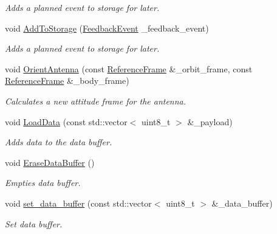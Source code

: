 \begin{DoxyCompactItemize}
\begin{DoxyCompactList}\small\item\em Adds a planned event to storage for later. \end{DoxyCompactList}\item 
void \hyperlink{classosse_1_1collaborate_1_1_subsystem_comm_a8167af09faf10dec260295c1542de585}{Add\+To\+Storage} (\hyperlink{structosse_1_1collaborate_1_1_subsystem_comm_1_1_feedback_event}{Feedback\+Event} \+\_\+feedback\+\_\+event)
\begin{DoxyCompactList}\small\item\em Adds a planned event to storage for later. \end{DoxyCompactList}\item 
void \hyperlink{classosse_1_1collaborate_1_1_subsystem_comm_a8f806bb513c9b15ce8f8a345856ca33b}{Orient\+Antenna} (const \hyperlink{classosse_1_1collaborate_1_1_reference_frame}{Reference\+Frame} \&\+\_\+orbit\+\_\+frame, const \hyperlink{classosse_1_1collaborate_1_1_reference_frame}{Reference\+Frame} \&\+\_\+body\+\_\+frame)
\begin{DoxyCompactList}\small\item\em Calculates a new attitude frame for the antenna. \end{DoxyCompactList}\item 
void \hyperlink{classosse_1_1collaborate_1_1_subsystem_comm_a5177011bf7857dcb5d202ab460d2fc54}{Load\+Data} (const std\+::vector$<$ uint8\+\_\+t $>$ \&\+\_\+payload)
\begin{DoxyCompactList}\small\item\em Adds data to the data buffer. \end{DoxyCompactList}\item 
\mbox{\label{classosse_1_1collaborate_1_1_subsystem_comm_a9ab6002b3bf8b3a8ac28735d017577bc}} 
void \hyperlink{classosse_1_1collaborate_1_1_subsystem_comm_a9ab6002b3bf8b3a8ac28735d017577bc}{Erase\+Data\+Buffer} ()
\begin{DoxyCompactList}\small\item\em Empties data buffer. \end{DoxyCompactList}\item 
void \hyperlink{classosse_1_1collaborate_1_1_subsystem_comm_a2679fccc19316e5fd32ff6e0786a0262}{set\+\_\+data\+\_\+buffer} (const std\+::vector$<$ uint8\+\_\+t $>$ \&\+\_\+data\+\_\+buffer)
\begin{DoxyCompactList}\small\item\em Set data buffer. \end{DoxyCompactList}\item 

\end{DoxyCompactItemize}
